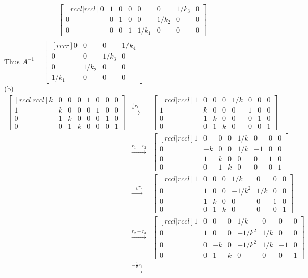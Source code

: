 \begin{solution}
\begin{eqnarray*}
\begin{bmatrix}[rccl|rccl]
0&1&0&0&0&0&1/k_3&0\\
0&0&1&0&0&1/k_2&0&0\\
0&0&0&1&1/k_1&0&0&0
\end{bmatrix}\\
\end{eqnarray*}
Thus $A^{-1}=\begin{bmatrix}[rrrr]
0&0&0&1/k_4\\
0&0&1/k_3&0\\
0&1/k_2&0&0\\
1/k_1&0&0&0
\end{bmatrix}
$
\ \\
(b) 
\begin{eqnarray*}
\begin{bmatrix}[rccl|rccl]
k&0&0&0&1&0&0&0\\
1&k&0&0&0&1&0&0\\
0&1&k&0&0&0&1&0\\
0&0&1&k&0&0&0&1
\end{bmatrix}
&\xrightarrow[]{\frac{1}{k}r_1}&
\begin{bmatrix}[rccl|rccl]
1&0&0&0&1/k&0&0&0\\
1&k&0&0&0&1&0&0\\
0&1&k&0&0&0&1&0\\
0&0&1&k&0&0&0&1
\end{bmatrix}\\
&\xrightarrow[]{r_1 - r_2}&
\begin{bmatrix}[rccl|rccl]
1&0&0&0&1/k&0&0&0\\
0&-k&0&0&1/k&-1&0&0\\
0&1&k&0&0&0&1&0\\
0&0&1&k&0&0&0&1
\end{bmatrix}\\
&\xrightarrow[]{-\frac{1}{k}r_2}&
\begin{bmatrix}[rccl|rccl]
1&0&0&0&1/k&0&0&0\\
0&1&0&0&-1/k^2&1/k&0&0\\
0&1&k&0&0&0&1&0\\
0&0&1&k&0&0&0&1
\end{bmatrix}\\
&\xrightarrow[]{r_2 - r_3}&
\begin{bmatrix}[rccl|rccl]
1&0&0&0&1/k&0&0&0\\
0&1&0&0&-1/k^2&1/k&0&0\\
0&0&-k&0&-1/k^2&1/k&-1&0\\
0&0&1&k&0&0&0&1
\end{bmatrix}\\
&\xrightarrow[]{-\frac{1}{k}r_3}&

\end{eqnarray*}
\end{solution}
